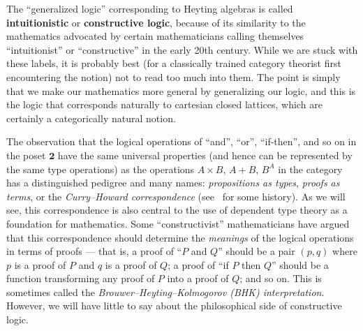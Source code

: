 \documentclass{book}
\def\tv{\mathbf{2}}
\begin{document}
The ``generalized logic'' corresponding to Heyting algebras is called \textbf{intuitionistic} or \textbf{constructive logic}, because of its similarity to the mathematics advocated by certain mathematicians calling themselves ``intuitionist'' or ``constructive'' in the early 20th century.
While we are stuck with these labels, it is probably best (for a classically trained category theorist first encountering the notion) not to read too much into them.
The point is simply that we make our mathematics more general by generalizing our logic, and this is the logic that corresponds naturally to cartesian closed lattices, which are certainly a categorically natural notion.

The observation that the logical operations of ``and'', ``or'', ``if-then'', and so on in the poset $\tv$ have the same universal properties (and hence can be represented by the same type operations) as the operations $A\times B$, $A+B$, $B^A$ in the category \bSet has a distinguished pedigree and many names: \emph{propositions as types}, \emph{proofs as terms}, or the \emph{Curry--Howard correspondence} (see~\cite{wadler:pat} for some history).
As we will see, this correspondence is also central to the use of dependent type theory as a foundation for mathematics.
Some ``constructivist'' mathematicians have argued that this correspondence should determine the \emph{meanings} of the logical operations in terms of proofs --- that is, a proof of ``$P$ and $Q$'' should be a pair $(p,q)$ where $p$ is a proof of $P$ and $q$ is a proof of $Q$; a proof of ``if $P$ then $Q$'' should be a function transforming any proof of $P$ into a proof of $Q$; and so on.
This is sometimes called the \emph{Brouwer--Heyting--Kolmogorov (BHK) interpretation}.
However, we will have little to say about the philosophical side of constructive logic.
\end{document}
